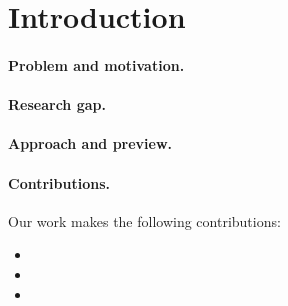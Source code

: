\section{Introduction}
\label{sec:introduction}


\paragraph{Problem and motivation.}

\paragraph{Research gap.}

\paragraph{Approach and preview.}

\paragraph{Contributions.}
Our work makes the following contributions:
\begin{itemize}[leftmargin=2em]
  \item {}
  \item {}
  \item {}
\end{itemize}

